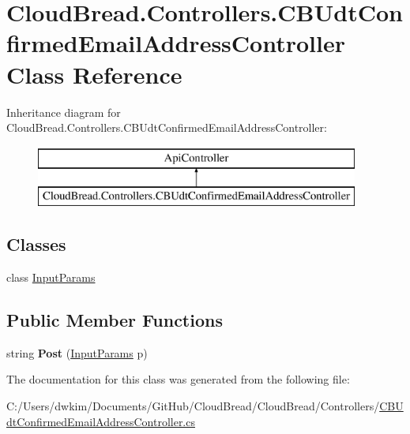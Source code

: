 \hypertarget{class_cloud_bread_1_1_controllers_1_1_c_b_udt_confirmed_email_address_controller}{}\section{Cloud\+Bread.\+Controllers.\+C\+B\+Udt\+Confirmed\+Email\+Address\+Controller Class Reference}
\label{class_cloud_bread_1_1_controllers_1_1_c_b_udt_confirmed_email_address_controller}
Inheritance diagram for Cloud\+Bread.\+Controllers.\+C\+B\+Udt\+Confirmed\+Email\+Address\+Controller\+:\begin{figure}[H]
\begin{center}
\leavevmode
\includegraphics[height=2.000000cm]{class_cloud_bread_1_1_controllers_1_1_c_b_udt_confirmed_email_address_controller}
\end{center}
\end{figure}
\subsection*{Classes}
\begin{DoxyCompactItemize}
\item 
class \hyperlink{class_cloud_bread_1_1_controllers_1_1_c_b_udt_confirmed_email_address_controller_1_1_input_params}{Input\+Params}
\end{DoxyCompactItemize}
\subsection*{Public Member Functions}
\begin{DoxyCompactItemize}
\item 
string {\bfseries Post} (\hyperlink{class_cloud_bread_1_1_controllers_1_1_c_b_udt_confirmed_email_address_controller_1_1_input_params}{Input\+Params} p)\hypertarget{class_cloud_bread_1_1_controllers_1_1_c_b_udt_confirmed_email_address_controller_a93380bf8890ef136fa3792a555002aa0}{}\label{class_cloud_bread_1_1_controllers_1_1_c_b_udt_confirmed_email_address_controller_a93380bf8890ef136fa3792a555002aa0}

\end{DoxyCompactItemize}


The documentation for this class was generated from the following file\+:\begin{DoxyCompactItemize}
\item 
C\+:/\+Users/dwkim/\+Documents/\+Git\+Hub/\+Cloud\+Bread/\+Cloud\+Bread/\+Controllers/\hyperlink{_c_b_udt_confirmed_email_address_controller_8cs}{C\+B\+Udt\+Confirmed\+Email\+Address\+Controller.\+cs}\end{DoxyCompactItemize}
